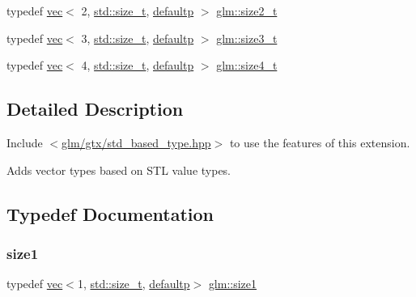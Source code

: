 \begin{DoxyCompactItemize}
typedef \hyperlink{structglm_1_1vec}{vec}$<$ 2, \hyperlink{_s_d_l__config__winrt_8h_a7c94ea6f8948649f8d181ae55911eeaf}{std\+::size\+\_\+t}, \hyperlink{namespaceglm_a36ed105b07c7746804d7fdc7cc90ff25a9d21ccd8b5a009ec7eb7677befc3bf51}{defaultp} $>$ \hyperlink{group__gtx__std__based__type_ga701549a040be1f2f6f661ddecde337de}{glm\+::size2\+\_\+t}
\item 
typedef \hyperlink{structglm_1_1vec}{vec}$<$ 3, \hyperlink{_s_d_l__config__winrt_8h_a7c94ea6f8948649f8d181ae55911eeaf}{std\+::size\+\_\+t}, \hyperlink{namespaceglm_a36ed105b07c7746804d7fdc7cc90ff25a9d21ccd8b5a009ec7eb7677befc3bf51}{defaultp} $>$ \hyperlink{group__gtx__std__based__type_gaf0ec088c61853e4ed8155ef66b3760a2}{glm\+::size3\+\_\+t}
\item 
typedef \hyperlink{structglm_1_1vec}{vec}$<$ 4, \hyperlink{_s_d_l__config__winrt_8h_a7c94ea6f8948649f8d181ae55911eeaf}{std\+::size\+\_\+t}, \hyperlink{namespaceglm_a36ed105b07c7746804d7fdc7cc90ff25a9d21ccd8b5a009ec7eb7677befc3bf51}{defaultp} $>$ \hyperlink{group__gtx__std__based__type_ga2bb2915bb83bb9d7a2967fe20aa7d2a5}{glm\+::size4\+\_\+t}
\end{DoxyCompactItemize}


\subsection{Detailed Description}
Include $<$\hyperlink{std__based__type_8hpp}{glm/gtx/std\+\_\+based\+\_\+type.\+hpp}$>$ to use the features of this extension.

Adds vector types based on S\+TL value types. 

\subsection{Typedef Documentation}
\mbox{\label{group__gtx__std__based__type_gaf471290b8165697d088a943263fc8af1}} 
\subsubsection{\texorpdfstring{size1}{size1}}
{\footnotesize\ttfamily typedef \hyperlink{structglm_1_1vec}{vec}$<$1, \hyperlink{_s_d_l__config__winrt_8h_a7c94ea6f8948649f8d181ae55911eeaf}{std\+::size\+\_\+t}, \hyperlink{namespaceglm_a36ed105b07c7746804d7fdc7cc90ff25a9d21ccd8b5a009ec7eb7677befc3bf51}{defaultp}$>$ \hyperlink{group__gtx__std__based__type_gaf471290b8165697d088a943263fc8af1}{glm\+::size1}}

